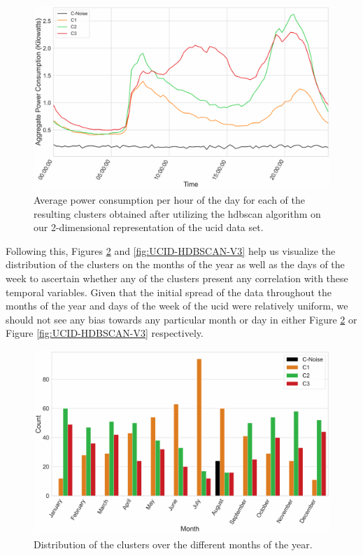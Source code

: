 \begin{adjustwidth}{-1.65cm}{-0.0cm}
\begin{enumerate}[label=Step 2.\arabic*:, leftmargin=*]
        \begin{figure}[hbt!]
            \centering
            \includegraphics[width=\textwidth]{Images/Chapter 6/UCID/UCID-HDBSCAN-V1.pdf}
            \caption{Average power consumption per hour of the day for each of the resulting clusters obtained after utilizing the \gls{hdbscan} algorithm on our 2-dimensional representation of the \gls{ucid} data set.}
            \label{fig:UCID-HDBSCAN-V1}
        \end{figure}
        
        \noindent \newline Following this, Figures \ref{fig:UCID-HDBSCAN-V2} and \ref{fig:UCID-HDBSCAN-V3} help us visualize the distribution of the clusters on the months of the year as well as the days of the week to ascertain whether any of the clusters present any correlation with these temporal variables. Given that the initial spread of the data throughout the months of the year and days of the week of the \gls{ucid} were relatively uniform, we should not see any bias towards any particular month or day in either Figure \ref{fig:UCID-HDBSCAN-V2} or Figure \ref{fig:UCID-HDBSCAN-V3} respectively.
        
        
        \begin{figure}[H]
            \centering
            \includegraphics[width=\textwidth]{Images/Chapter 6/UCID/UCID-HDBSCAN-V2.pdf}
            \caption{Distribution of the clusters over the different months of the year.}
            \label{fig:UCID-HDBSCAN-V2}
        \end{figure}
        

\end{enumerate}
\end{adjustwidth}
